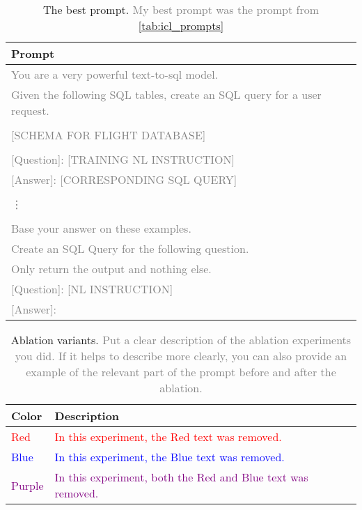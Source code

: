 \documentclass{article}
\begin{document}
\begin{table}[h!]
\centering
\begin{tabular}{p{13.5cm}}
\toprule
\textbf{Prompt} \\
\midrule
\textcolor{gray}{You are a very powerful text-to-sql model. }\\
\textcolor{gray}{Given the following SQL tables, create an SQL query for a user request.} \\
\textcolor{gray}{} \\
\textcolor{gray}{[SCHEMA FOR FLIGHT DATABASE]} \\
\textcolor{gray}{} \\
\textcolor{gray}{[Question]: [TRAINING NL INSTRUCTION] }\\
\textcolor{gray}{[Answer]: [CORRESPONDING SQL QUERY]} \\
\\
\textcolor{gray}{\vdots} \\
\\
\textcolor{gray}{Base your answer on these examples.} \\
\textcolor{gray}{Create an SQL Query for the following question.} \\
\textcolor{gray}{Only return the output and nothing else.} \\
\textcolor{gray}{[Question]: [NL INSTRUCTION]} \\
\textcolor{gray}{[Answer]: } \\
\bottomrule
\end{tabular}
\caption{The best prompt.
{\textcolor{gray}{My best prompt was the prompt from \autoref{tab:icl_prompts}}}
}
\label{tab:best_prompt}
\end{table}



\begin{table}[h!]
\centering
\begin{tabular}{p{2cm}p{10cm}}
\toprule
\textbf{Color} & \textbf{Description} \\
\midrule
\textcolor{Red}{Red} & \textcolor{Red}{In this experiment, the Red text was removed.} \\
\textcolor{Blue}{Blue} & \textcolor{Blue}{In this experiment, the Blue text was removed.} \\
\textcolor{Purple}{Purple} & \textcolor{Purple}{In this experiment, both the Red and Blue text was removed.} \\
\bottomrule
\end{tabular}
\caption{Ablation variants.
{\textcolor{gray}{Put a clear description of the ablation experiments you did. If it helps to describe more clearly, you can also provide an example of the relevant part of the prompt before and after the ablation.}
}}
\label{tab:ablation_explanation}
\end{table}
\end{document}
